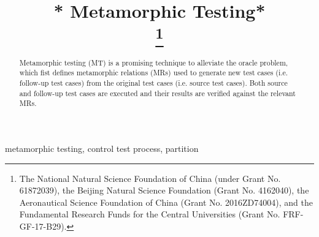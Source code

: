 \documentclass[conference]{IEEEtran}
\begin{document}
\title{* Metamorphic Testing*\\
\thanks{The National Natural Science Foundation of China (under Grant No. 61872039),
the Beijing Natural Science Foundation (Grant No. 4162040),
the Aeronautical Science Foundation of China (Grant No. 2016ZD74004), and
the Fundamental Research Funds for the Central Universities (Grant No. FRF-GF-17-B29).}
}

\author{
\and
{}
\and
{}
}

\maketitle

\begin{abstract}
  Metamorphic testing (MT) is a promising technique to alleviate the oracle problem, which fist defines metamorphic relations (MRs) used to generate new test cases (i.e. follow-up
  test cases) from the original test cases (i.e. source test cases). Both source and follow-up test cases are executed and their results are verified against the relevant MRs.

\end{abstract}

\begin{IEEEkeywords}
metamorphic testing, control test process, partition
\end{IEEEkeywords}
\end{document}
